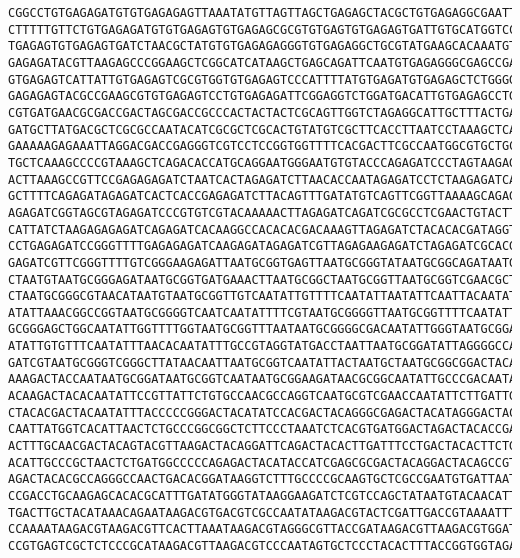 \documentclass[11pt]{article}
\begin{document}
\begin{tcolorbox}[breakable, size=fbox, boxrule=.5pt, pad at break*=1mm, opacityfill=0]
\begin{Verbatim}[commandchars=\\\{\}]
CGGCCTGTGAGAGATGTGTGAGAGAGTTAAATATGTTAGTTAGCTGAGAGCTACGCTGTGAGAGGCGAATTGACGTAGTG
CTTTTTGTTCTGTGAGAGATGTGTGAGAGTGTGAGAGCGCGTGTGAGTGTGAGAGTGATTGTGCATGGTCCAGTAAGATG
TGAGAGTGTGAGAGTGATCTAACGCTATGTGTGAGAGAGGGTGTGAGAGGCTGCGTATGAAGCACAAATGTGAGAGTTGT
GAGAGATACGTTAAGAGCCCGGAAGCTCGGCATCATAAGCTGAGCAGATTCAATGTGAGAGGGCGAGCCGACGGTAGGCT
GTGAGAGTCATTATTGTGAGAGTCGCGTGGTGTGAGAGTCCCATTTTATGTGAGATGTGAGAGCTCTGGGGCTGTGATGT
GAGAGAGTACGCCGAAGCGTGTGAGAGTCCTGTGAGAGATTCGGAGGTCTGGATGACATTGTGAGAGCCTGCTTACGCGA
CGTGATGAACGCGACCGACTAGCGACCGCCCACTACTACTCGCAGTTGGTCTAGAGGCATTGCTTTACTGAAATACGCAG
GATGCTTATGACGCTCGCGCCAATACATCGCGCTCGCACTGTATGTCGCTTCACCTTAATCCTAAAGCTCAAATATAACG
GAAAAAGAGAAATTAGGACGACCGAGGGTCGTCCTCCGGTGGTTTTCACGACTTCGCCAATGGCGTGCTGCGTCGAAATG
TGCTCAAAGCCCCGTAAAGCTCAGACACCATGCAGGAATGGGAATGTGTACCCAGAGATCCCTAGTAAGAGAGATCCAAG
ACTTAAAGCCGTTCCGAGAGAGATCTAATCACTAGAGATCTTAACACCAATAGAGATCCTCTAAGAGATCAGTAGAGATC
GCTTTTCAGAGATAGAGATCACTCACCGAGAGATCTTACAGTTTGATATGTCAGTTCGGTTAAAAGCAGAGATCGTCTGC
AGAGATCGGTAGCGTAGAGATCCCGTGTCGTACAAAAACTTAGAGATCAGATCGCGCCTCGAACTGTACTTAGAGATCTA
CATTATCTAAGAGAGAGATCAGAGATCACAAGGCCACACACGACAAAGTTAGAGATCTACACACGATAGGTGGTGCCGAA
CCTGAGAGATCCGGGTTTTGAGAGAGATCAAGAGATAGAGATCGTTAGAGAAGAGATCTAGAGATCGCACGGGTTTTGGA
GAGATCGTTCGGGTTTTGTCGGGAAGAGATTAATGCGGTGAGTTAATGCGGGTATAATGCGGCAGATAATGTAATGCGGT
CTAATGTAATGCGGGAGATAATGCGGTGATGAAACTTAATGCGGCTAATGCGGTTAATGCGGTCGAACGCTAATGCGGAG
CTAATGCGGGCGTAACATAATGTAATGCGGTTGTCAATATTGTTTTCAATATTAATATTCAATTACAATATTCAAACGCA
ATATTAAACGGCCGGTAATGCGGGGTCAATCAATATTTTCGTAATGCGGGGTTAATGCGGTTTTCAATATTATCGGTAAT
GCGGGAGCTGGCAATATTGGTTTTGGTAATGCGGTTTAATAATGCGGGGCGACAATATTGGGTAATGCGGATATTTATCA
ATATTGTGTTTCAATATTTAACACAATATTTGCCGTAGGTATGACCTAATTAATGCGGATATTAGGGGCCAATTAATGCG
GATCGTAATGCGGGTCGGGCTTATAACAATTAATGCGGTCAATATTACTAATGCTAATGCGGCGGACTACAATATTTACA
AAAGACTACCAATAATGCGGATAATGCGGTCAATAATGCGGAAGATAACGCGGCAATATTGCCCGACAATATTTGACTAC
ACAAGACTACACAATATTCCGTTATTCTGTGCCAACGCCAGGTCAATGCGTCGAACCAATATTCTTGATTGTGATGCAGA
CTACACGACTACAATATTTACCCCCGGGACTACATATCCACGACTACAGGGCGAGACTACATAGGGACTACAGACTACAA
CAATTATGGTCACATTAACTCTGCCCGGCGGCTCTTCCCTAAATCTCACGTGATGGACTAGACTACACCGACTACAACAT
ACTTTGCAACGACTACAGTACGTTAAGACTACAGGATTCAGACTACACTTGATTTCCTGACTACACTTCTGACAACCCGC
ACATTGCCCGCTAACTCTGATGGCCCCCAGAGACTACATACCATCGAGCGCGACTACAGGACTACAGCCGTAGACCCTTT
AGACTACACGCCAGGGCCAACTGACACGGATAAGGTCTTTGCCCCGCAAGTGCTCGCCGAATGTGATTAATCTCAACATT
CCGACCTGCAAGAGCACACGCATTTGATATGGGTATAAGGAAGATCTCGTCCAGCTATAATGTACAACATTTCCCCGTCA
TGACTTGCTACATAAACAGAATAAGACGTGACGTCGCCAATATAAGACGTACTCGATTGACCGTAAAATTTTTCTAAGAA
CCAAAATAAGACGTAAGACGTTCACTTAAATAAGACGTAGGGCGTTACCGATAAGACGTTAAGACGTGGATCGCCATCGC
CCGTGAGTCGCTCTCCCGCATAAGACGTTAAGACGTCCCAATAGTGCTCCCTACACTTTACCGGTGGTAGATAAGACGTA

\end{Verbatim}
\end{tcolorbox}
\end{document}
